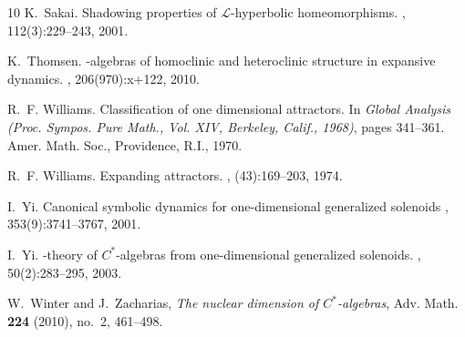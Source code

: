\documentclass{amsart}
\theoremstyle{plain}
\theoremstyle{definition}
\theoremstyle{remark}
\begin{document}
\begin{thebibliography}{10}
K.~Sakai.
\newblock Shadowing properties of {$\mathcal{L}$}-hyperbolic homeomorphisms.
, 112(3):229--243, 2001.


K.~Thomsen.
-algebras of homoclinic and heteroclinic structure in
  expansive dynamics.
, 206(970):x+122, 2010.


R.~F. Williams.
\newblock Classification of one dimensional attractors.
\newblock In {\em Global {A}nalysis ({P}roc. {S}ympos. {P}ure {M}ath., {V}ol.
  {XIV}, {B}erkeley, {C}alif., 1968)}, pages 341--361. Amer. Math. Soc.,
  Providence, R.I., 1970.

R.~F. Williams.
\newblock Expanding attractors.
, (43):169--203, 1974.

I.~Yi.
\newblock Canonical symbolic dynamics for one-dimensional generalized
              solenoids
, 353(9):3741--3767, 2001.

I.~Yi.
-theory of {$C^\ast$}-algebras from one-dimensional generalized
  solenoids.
, 50(2):283--295, 2003.


{W.~Winter and J.~Zacharias}, \emph{{The nuclear dimension of
  $C^{*}$-algebras}}, {Adv. Math.} \textbf{{224}} (2010), no.~{2}, {461--498}.

\end{thebibliography}
\end{document}
